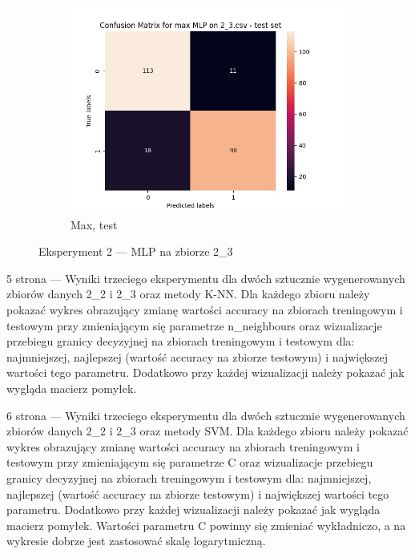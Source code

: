 \documentclass[12pt]{article}
\newcommand*{\subfigwidth}{0.24\textwidth}
\begin{document}
\begin{figure}[H]
\begin{subfigure}[t]{\subfigwidth}
        \includegraphics[width=\linewidth]{img/exp_2/mlp/2_3/max/test_matrix.png}
        \caption{Max, test}
    \end{subfigure} 
    
    \caption{Eksperyment 2 --- MLP na zbiorze 2\_3}
\end{figure}

\clearpage

5 strona --- Wyniki trzeciego eksperymentu dla dwóch sztucznie wygenerowanych zbiorów danych 2\_2 i 2\_3 oraz metody K-NN. Dla każdego zbioru należy pokazać wykres obrazujący zmianę wartości accuracy na zbiorach treningowym i testowym przy zmieniającym się parametrze n\_neighbours oraz wizualizacje przebiegu granicy decyzyjnej na zbiorach treningowym i testowym dla: najmniejszej, najlepszej (wartość accuracy na zbiorze testowym) i największej wartości tego parametru. Dodatkowo przy każdej wizualizacji należy pokazać jak wygląda macierz pomyłek.

\clearpage

6 strona --- Wyniki trzeciego eksperymentu dla dwóch sztucznie wygenerowanych zbiorów danych 2\_2 i 2\_3 oraz metody SVM. Dla każdego zbioru należy pokazać wykres obrazujący zmianę wartości accuracy na zbiorach treningowym i testowym przy zmieniającym się parametrze C oraz wizualizacje przebiegu granicy decyzyjnej na zbiorach treningowym i testowym dla: najmniejszej, najlepszej (wartość accuracy na zbiorze testowym) i największej wartości tego parametru. Dodatkowo przy każdej wizualizacji należy pokazać jak wygląda macierz pomyłek. Wartości parametru C powinny się zmieniać wykładniczo, a na wykresie dobrze jest zastosować skalę logarytmiczną.
\end{document}
